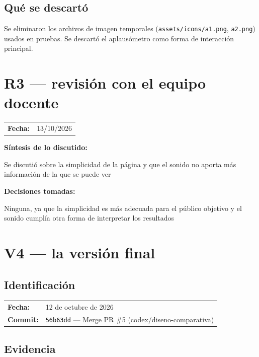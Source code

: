 \documentclass{article}
\begin{document}
\subsection{Qu\'{e} se descart\'{o}}

Se eliminaron los archivos de imagen temporales (\texttt{assets/icons/a1.png}, \texttt{a2.png})
usados en pruebas. Se descart\'{o} el aplaus\'{o}metro como forma de interacci\'{o}n principal.

\section{R3 --- revisi\'{o}n con el equipo docente}

\begin{tabular}{ll}
  \textbf{Fecha:} & {13/10/2026} \\
\end{tabular}

\medskip
\noindent\textbf{S\'{i}ntesis de lo discutido:}

{Se discutió sobre la simplicidad de la página y que el sonido no aporta más información de la que se puede ver}

\medskip
\noindent\textbf{Decisiones tomadas:}

{Ninguna, ya que la simplicidad es más adecuada para el público objetivo y el sonido cumplía otra forma de interpretar los resultados}

\section{V4 --- la versi\'{o}n final}

\subsection{Identificaci\'{o}n}

\begin{tabular}{ll}
  \textbf{Fecha:}  & 12 de octubre de 2026 \\
  \textbf{Commit:} & \texttt{56b63dd} --- Merge PR \#5 (codex/diseno-comparativa) \\
\end{tabular}

\subsection{Evidencia}
\end{document}
